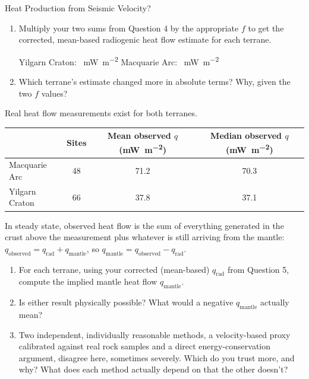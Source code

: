 \begin{activity}{Heat Production from Seismic Velocity?}
\begin{questions}
  \begin{enumerate}[label=(\alph*)]
    \item Multiply your two sums from Question 4 by the appropriate $f$ to get the corrected, mean-based radiogenic heat flow estimate for each terrane.

    \vspace{0.5em}
    Yilgarn Craton: \numberbox[1.5cm]\ \si{mW.m^{-2}}
    \qquad\qquad 
    Macquarie Arc: \numberbox[1.5cm]\ \si{mW.m^{-2}} \\
    \vspace{0.5em}

    \item Which terrane's estimate changed more in absolute terms? Why, given the two $f$ values?
    \answerbox[2cm]
  \end{enumerate}


  Real heat flow measurements exist for both terranes.

  \begin{center}
  \begin{tabular}{lccc}
    \toprule
    & Sites & Mean observed $q$ (\si{mW.m^{-2}}) & Median observed $q$ (\si{mW.m^{-2}}) \\
    \midrule
    Macquarie Arc   & 48 & 71.2 & 70.3 \\
    Yilgarn Craton  & 66 & 37.8 & 37.1 \\
    \bottomrule
  \end{tabular}
  \end{center}

  In steady state, observed heat flow is the sum of everything generated in the crust above the measurement plus whatever is still arriving from the mantle: $q_\text{observed} = q_\text{rad} + q_\text{mantle}$, so $q_\text{mantle} = q_\text{observed} - q_\text{rad}$.

  \begin{enumerate}[label=(\alph*)]
    \item For each terrane, using your corrected (mean-based) $q_\text{rad}$ from Question 5, compute the implied mantle heat flow $q_\text{mantle}$.
    \answerbox[2.5cm]

    \item Is either result physically possible? What would a negative $q_\text{mantle}$ actually mean?
    \answerbox[2cm]

    \item Two independent, individually reasonable methods, a velocity-based proxy calibrated against real rock samples and a direct energy-conservation argument, disagree here, sometimes severely. Which do you trust more, and why? What does each method actually depend on that the other doesn't?
    \answerbox[3cm]


\end{enumerate}
\end{questions}
\end{activity}
